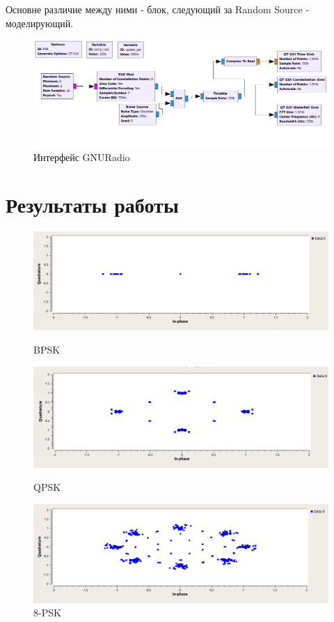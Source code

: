 Основне различие между ними - блок, следующий за Random Source - моделирующий.

\begin{figure}[H]
	\begin{center}
		\includegraphics[width=\linewidth]{pics/GNURadio}
		\caption{Интерфейс GNURadio}
		\label{fig:GNURadio}
	\end{center}
\end{figure}

\newpage
\section{Результаты работы}

\begin{figure}[!htb]
	\includegraphics[width=\linewidth]{pics/BPSK}
	\caption{BPSK}\label{fig:BPSK}
	\endminipage\hfill
	\includegraphics[width=\linewidth]{pics/QPSK}
	\caption{QPSK}\label{fig:QPSK}
	\endminipage\hfill
	\includegraphics[width=\linewidth]{pics/8-PSK}
	\caption{8-PSK}\label{fig:8-PSK}
	\endminipage
\end{figure}

